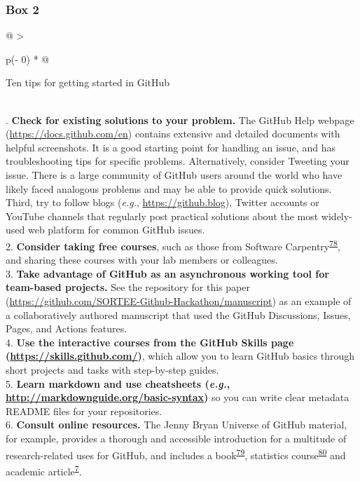 \hypertarget{tips}{%
\subsubsection{Box 2}\label{tips}}

\begin{tablenos:no-prefix-table-caption}

\begin{longtable}[]{@{}
  >{\raggedright\arraybackslash}p{(\columnwidth - 0\tabcolsep) * }@{}}
\toprule
\begin{minipage}[b]{\linewidth}\raggedright
Ten tips for getting started in GitHub
\end{minipage} \\
\midrule
{}. \textbf{Check for existing solutions to your problem.} The GitHub Help webpage (\url{https://docs.github.com/en}) contains extensive and detailed documents with helpful screenshots. It is a good starting point for handling an issue, and has troubleshooting tips for specific problems. Alternatively, consider Tweeting your issue. There is a large community of GitHub users around the world who have likely faced analogous problems and may be able to provide quick solutions. Third, try to follow blogs (\emph{e.g.}, \url{https://github.blog}), Twitter accounts or YouTube channels that regularly post practical solutions about the most widely-used web platform for common GitHub issues. \\
2. \textbf{Consider taking free courses}, such as those from Software Carpentry\textsuperscript{\protect\hyperlink{ref-pjy75gHr}{78}}, and sharing these courses with your lab members or colleagues. \\
3. \textbf{Take advantage of GitHub as an asynchronous working tool for team-based projects.} See the repository for this paper (\url{https://github.com/SORTEE-Github-Hackathon/manuscript}) as an example of a collaboratively authored manuscript that used the GitHub Discussions, Issues, Pages, and Actions features. \\
4. \textbf{Use the interactive courses from the GitHub Skills page (\url{https://skills.github.com/})}, which allow you to learn GitHub basics through short projects and tasks with step-by-step guides. \\
5. \textbf{Learn markdown and use cheatsheets (\emph{e.g.}, \url{http://markdownguide.org/basic-syntax})} so you can write clear metadata README files for your repositories. \\
6. \textbf{Consult online resources.} The Jenny Bryan Universe of GitHub material, for example, provides a thorough and accessible introduction for a multitude of research-related uses for GitHub, and includes a book\textsuperscript{\protect\hyperlink{ref-ZvrOcg9w}{79}}, statistics course\textsuperscript{\protect\hyperlink{ref-6CMMeSeD}{80}} and academic article\textsuperscript{\protect\hyperlink{ref-RVetqmsg}{7}}. \\

\end{longtable}
\end{tablenos:no-prefix-table-caption}
